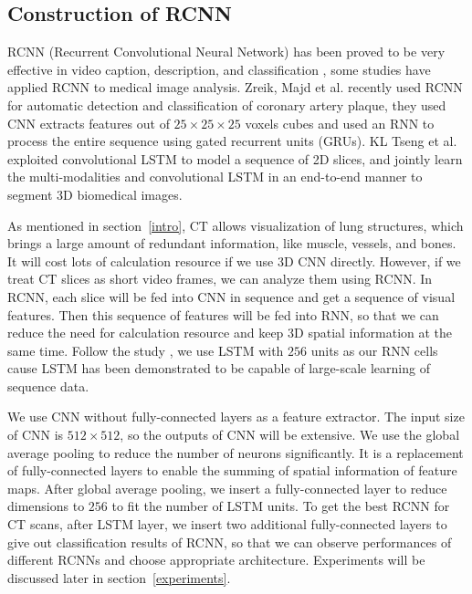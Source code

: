 \documentclass[journal]{IEEEtran}
\begin{document}
\subsection{Construction of RCNN}
\label{RCNN}
RCNN (Recurrent Convolutional Neural Network) has been proved to be very effective in video caption, description, and classification \cite{Donahue2015Long, Aafaq2019Spatio}, some studies have applied RCNN to medical image analysis. Zreik, Majd et al. \cite{Zreik2018A} recently used RCNN for automatic detection and classification of coronary artery plaque, they used CNN extracts features out of $ 25\times25\times25$ voxels cubes and used an RNN to process the entire sequence using gated recurrent units (GRUs)\cite{chung2014empirical}. KL Tseng et al. \cite{tseng2017joint} exploited convolutional LSTM to model a sequence of 2D slices, and jointly learn the multi-modalities and convolutional LSTM in an end-to-end manner to segment 3D biomedical images.

As mentioned in section~\ref{intro}, CT allows visualization of lung structures, which brings a large amount of redundant information, like muscle, vessels, and bones. It will cost lots of calculation resource if we use 3D CNN directly. However, if we treat CT slices as short video frames, we can analyze them using RCNN. In RCNN, each slice will be fed into CNN in sequence and get a sequence of visual features. Then this sequence of features will be fed into RNN, so that we can reduce the need for calculation resource and keep 3D spatial information at the same time. 
Follow the study \cite{Donahue2015Long}, we use LSTM with $256$ units as our RNN cells cause LSTM has been demonstrated to be capable of large-scale learning of sequence data. 

We use CNN without fully-connected layers as a feature extractor. The input size of CNN is $512 \times 512$, so the outputs of CNN will be extensive. We use the global average pooling \cite{lin2014network} to reduce the number of neurons significantly. It is a replacement of fully-connected layers to enable the summing of spatial information of feature maps. After global average pooling, we insert a fully-connected layer to reduce dimensions to $256$ to fit the number of LSTM units.
To get the best RCNN for CT scans, after LSTM layer, we insert two additional fully-connected layers to give out classification results of RCNN, so that we can observe performances of different RCNNs and choose appropriate architecture. Experiments will be discussed later in section~\ref{experiments}.
\end{document}
